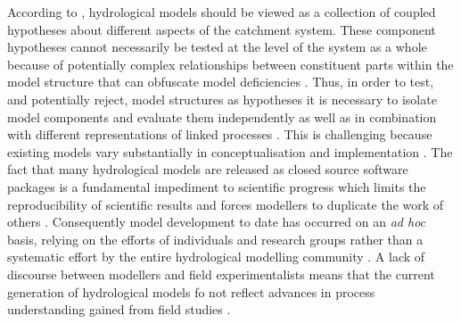 \documentclass{icldt}\usepackage[]{graphicx}\usepackage[]{color}
\begin{document}
According to \citet{clark2011}, hydrological models should be viewed as a collection of coupled hypotheses about different aspects of the catchment system. These component hypotheses cannot necessarily be tested at the level of the system as a whole because of potentially complex relationships between constituent parts within the model structure that can obfuscate model deficiencies \citep{clark2011,clark2012}. Thus, in order to test, and potentially reject, model structures as hypotheses it is necessary to isolate model components and evaluate them independently as well as in combination with different representations of linked processes \citep{clark2011}. This is challenging because existing models vary substantially in conceptualisation and implementation \citep{castronova2013,clark2015}. The fact that many hydrological models are released as closed source software packages is a fundamental impediment to scientific progress which limits the reproducibility of scientific results and forces modellers to duplicate the work of others \citep{morin2012,steiniger2013,moulds2015}. Consequently model development to date has occurred on an \textit{ad hoc} basis, relying on the efforts of individuals and research groups rather than a systematic effort by the entire hydrological modelling community \citep{buytaert2008,clark2015,troy2015,weiler2015}. A lack of discourse between modellers and field experimentalists means that the current generation of hydrological models fo not reflect advances in process understanding gained from field studies \citep{mcdonnell2007,clark2011}. \\
\end{document}
